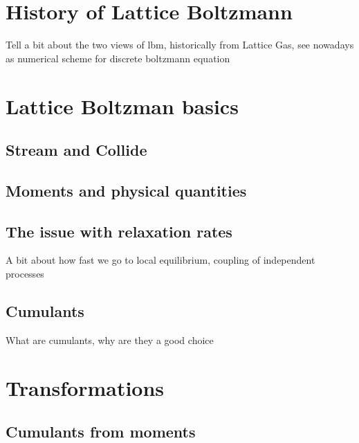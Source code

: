 \documentclass[12pt,a4paper,twoside]{article}
\begin{document}
\newpage
\tableofcontents
\newpage

\pagestyle{headings}

\section{History of Lattice Boltzmann}
\label{sec:History of Lattice Boltzmann}
\cite{geier2015cumulant}
\cite[Page 1]{d1994generalized}
\cite{harris2004introduction}
Tell a bit about the two views of lbm, historically from Lattice Gas, see nowadays as numerical scheme for discrete boltzmann equation

\section{Lattice Boltzman basics}
\label{sec:Lattice Boltzman basics}

\subsection{Stream and Collide}
\label{sub:Stream and Collide}

\subsection{Moments and physical quantities}
\label{sub:Moments and physical quantities}

\subsection{The issue with relaxation rates}
\label{sub:The issue with relaxation rates}
A bit about how fast we go to local equilibrium, coupling of independent processes

\subsection{Cumulants}
\label{sub:Cumulants}
What are cumulants, why are they a good choice

\section{Transformations}
\label{sec:Transformations}

\subsection{Cumulants from moments}
\label{sub:Cumulants from moments}
\end{document}
